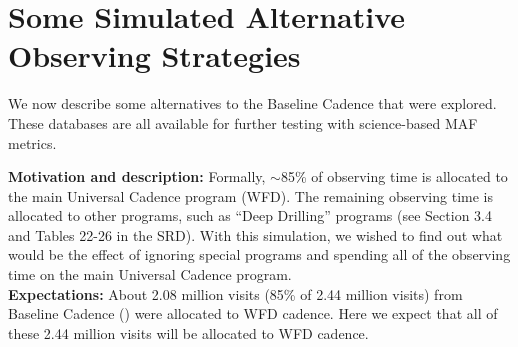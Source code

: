 \navigationbar









\section{Some Simulated Alternative Observing Strategies}
\def\secname{cadexp:alternatives}\label{sec:\secname}

We now describe some alternatives to the Baseline Cadence that were
explored. These \OpSim databases are all available for further testing
with science-based MAF metrics.



{\bf Motivation and description:} Formally, $\sim$85\% of observing
time is allocated to the main Universal Cadence program (WFD). The
remaining observing time is allocated to other programs, such as
``Deep Drilling'' programs (see Section 3.4 and Tables 22-26  in the
SRD). With this simulation, we wished to find out what would be the
effect of ignoring special programs and spending all of the observing
time on the main Universal Cadence program. \\

{\bf Expectations:} About 2.08 million visits (85\% of 2.44 million
visits) from Baseline Cadence () were allocated
to WFD cadence. Here we expect that all of these 2.44 million visits
will be allocated to WFD cadence. \\

